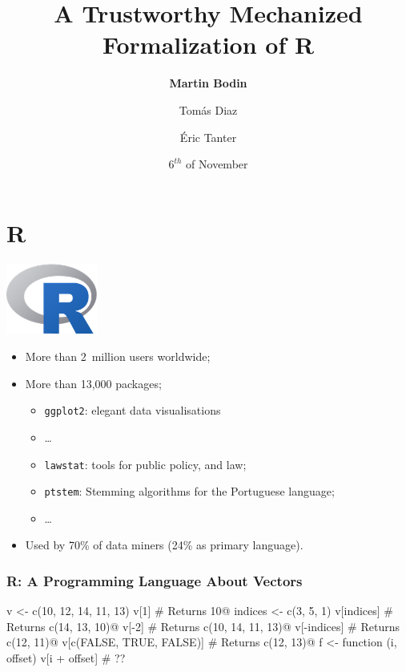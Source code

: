 \documentclass{beamer}
\title{A Trustworthy Mechanized Formalization of R}
\author{\textbf{Martin Bodin} \and Tomás Diaz \and Éric Tanter}
\institute{University of Chile}
\date{\(6^{th}\) of November}
\begin{document}
\begin{frame}
    \titlepage
\end{frame}

\section{R}

\begin{frame}
    \begin{center}
        \includegraphics[width=3cm]{images/Rlogo.png}
    \end{center}

    \vfill

    \begin{itemize}
        \item More than 2~million users worldwide;
        \item More than 13,000 packages;
            \begin{itemize}
                \item \texttt{ggplot2}: elegant data visualisations
                \item …
                \item \texttt{lawstat}: tools for public policy, and law;
                \item \texttt{ptstem}: Stemming algorithms for the Portuguese language;
                \item …
            \end{itemize}
        \item Used by 70\% of data miners (24\% as primary language).
    \end{itemize}
\end{frame}

\begin{frame}[fragile]
    \frametitle{R: A Programming Language About Vectors}

\begin{Rcode}
v <- c(10, 12, 14, 11, 13)
v[1]                          # Returns 10@\pause@
indices <- c(3, 5, 1)
v[indices]                    # Returns c(14, 13, 10)@\pause@
v[-2]                         # Returns c(10, 14, 11, 13)@\pause@
v[-indices]                   # Returns c(12, 11)@\pause@
v[c(FALSE, TRUE, FALSE)]      # Returns c(12, 13)@\pause@
f <- function (i, offset)
       v[i + offset]          # ??
\end{Rcode}

\end{frame}
\end{document}
